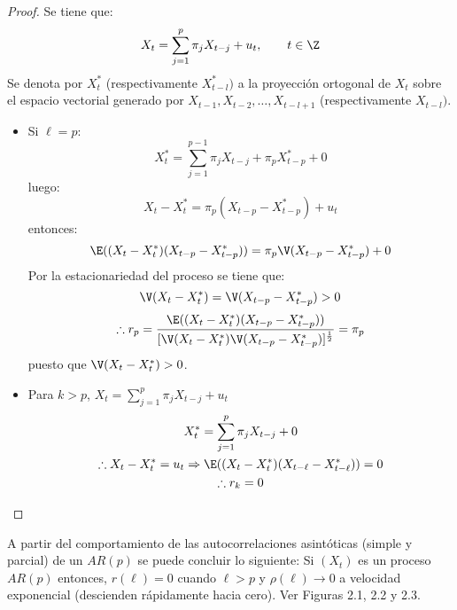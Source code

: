 \begin{proof}
Se tiene que:
\[
X_{t} =\sum_{j=1}^p {\pi_{j} X_{t-j} +u_{t} } ,
\qquad
t\in \Z
\]
Se denota por $X_{t}^{\ast } $ (respectivamente $X_{t-l}^{\ast })$ a la proyecci\'{o}n ortogonal de $X_{t}$ sobre el espacio vectorial generado por $X_{t-1}, X_{t-2},\ldots, X_{t-l+1}$ (respectivamente $X_{t-l})$.

\begin{itemize}
\item Si $\ell=p$: 
\[
X_{t}^{\ast } =\sum_{j=1}^{p-1} {\pi_{j} X_{t-j} +\pi_{p} 
X_{t-p}^{\ast } +0} 
\]
luego: 
\[
X_{t} -X_{t}^{\ast } =\pi_{p} (X_{t-p} -X_{t-p}^{\ast } )+u_{t} 
\]
entonces: 
\[
\E((X_{t} -X_{t}^{\ast } )(X_{t-p} -X_{t-p}^{\ast } ))=\pi_{p} \V(X_{t-p} 
-X_{t-p}^{\ast } )+0
\]
Por la estacionariedad del proceso se tiene que:
\[
\V(X_{t} -X_{t}^{\ast } )=\V(X_{t-p} -X_{t-p}^{\ast } )>0
\]
\[
\therefore r_{p} =\frac{\E((X_{t} -X_{t}^{\ast } )(X_{t-p} -X_{t-p}^{\ast } 
))}{[\V(X_{t} -X_{t}^{\ast } )\V(X_{t-p} -X_{t-p}^{\ast } 
)]^{\frac{1}{2}}}=\pi_{p} 
\]
puesto que $\V(X_{t} -X_{t}^{\ast } )>0$.

\item Para $k>p$, $X_{t} =\sum_{j=1}^p {\pi_{j} X_{t-j} +u_{t} } $
\begin{gather*}
X_{t}^{\ast } =\sum_{j=1}^p {\pi_{j} X_{t-j} } +0\\
\therefore X_{t} -X_{t}^{\ast } =u_{t} \Rightarrow \E((X_{t} -X_{t}^{\ast } )(X_{t-\ell } -X_{t-\ell }^{\ast } ))=0\\
\therefore r_{k} =0\qedhere
\end{gather*}
\end{itemize}
\end{proof}

\begin{observacion} A partir del comportamiento de las autocorrelaciones asint\'{o}ticas (simple y parcial) de un $AR(p)$ se puede concluir lo siguiente: Si $(X_{t})$ es un proceso $AR(p)$ entonces, $r(\ell)=0$ cuando $\ell>p$ y $\rho (\ell)\to 0$ a velocidad exponencial (descienden r\'{a}pidamente hacia cero). Ver Figuras 2.1, 2.2 y 2.3.
\end{observacion}


